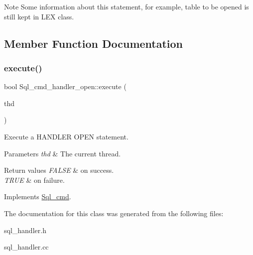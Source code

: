 \begin{DoxyNote}{Note}
Some information about this statement, for example, table to be opened is still kept in L\+EX class. 
\end{DoxyNote}


\subsection{Member Function Documentation}
\mbox{\label{classSql__cmd__handler__open_a79b3b42813bdf3d60fd796e149674d55}} 
\subsubsection{\texorpdfstring{execute()}{execute()}}
{\footnotesize\ttfamily bool Sql\+\_\+cmd\+\_\+handler\+\_\+open\+::execute (\begin{DoxyParamCaption}\item[{T\+HD $\ast$}]{thd }\end{DoxyParamCaption})\hspace{0.3cm}{\ttfamily [virtual]}}

Execute a H\+A\+N\+D\+L\+ER O\+P\+EN statement.


\begin{DoxyParams}{Parameters}
{\em thd} & The current thread.\\
\hline
\end{DoxyParams}

\begin{DoxyRetVals}{Return values}
{\em F\+A\+L\+SE} & on success. \\
\hline
{\em T\+R\+UE} & on failure. \\
\hline
\end{DoxyRetVals}


Implements \mbox{\hyperlink{classSql__cmd_a213367b79b551296fbb7790f2a3732fb}{Sql\+\_\+cmd}}.



The documentation for this class was generated from the following files\+:\begin{DoxyCompactItemize}
\item 
sql\+\_\+handler.\+h\item 
sql\+\_\+handler.\+cc\end{DoxyCompactItemize}
